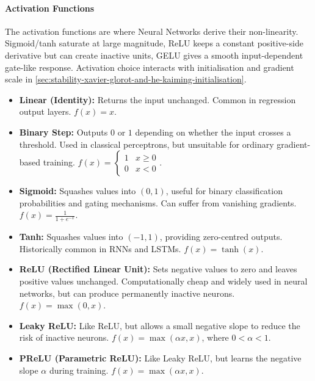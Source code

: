 \paragraph{Activation Functions}
The activation functions are where Neural Networks derive their non-linearity.
Sigmoid/tanh saturate at large magnitude, ReLU keeps a constant positive-side derivative but can create inactive units, GELU gives a smooth input-dependent gate-like response.
Activation choice interacts with initialisation and gradient scale in \cref{sec:stability-xavier-glorot-and-he-kaiming-initialisation}.

\begin{itemize}
    \item \textbf{Linear (Identity):} Returns the input unchanged. Common in regression output layers. $f(x)=x$.

    \item \textbf{Binary Step:} Outputs $0$ or $1$ depending on whether the input crosses a threshold. Used in classical perceptrons, but unsuitable for ordinary gradient-based training. $f(x)=\begin{cases}1 & x\geq0\\0 & x<0\end{cases}$.

    \item \textbf{Sigmoid:} Squashes values into $(0,1)$, useful for binary classification probabilities and gating mechanisms. Can suffer from vanishing gradients. $f(x)=\frac{1}{1+e^{-x}}$.

    \item \textbf{Tanh:} Squashes values into $(-1,1)$, providing zero-centred outputs. Historically common in RNNs and LSTMs. $f(x)=\tanh(x)$.

    \item \textbf{ReLU (Rectified Linear Unit):} Sets negative values to zero and leaves positive values unchanged. Computationally cheap and widely used in neural networks, but can produce permanently inactive neurons. $f(x)=\max(0,x)$.

    \item \textbf{Leaky ReLU:} Like ReLU, but allows a small negative slope to reduce the risk of inactive neurons. $f(x)=\max(\alpha x,x)$, where $0<\alpha<1$.

    \item \textbf{PReLU (Parametric ReLU):} Like Leaky ReLU, but learns the negative slope $\alpha$ during training. $f(x)=\max(\alpha x,x)$.


\end{itemize}
